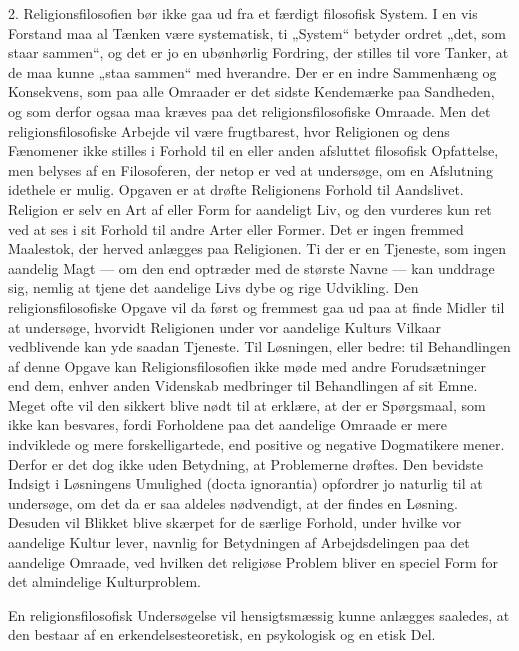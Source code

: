\documentclass[12pt,a4paper,openany]{book}
\newcommand{\opage}[1]{\marginnote{\footnotesize\textit{[#1]}}}
\begin{document}
2. Religionsfilosofien bør ikke gaa ud fra et færdigt filosofisk System.
I en vis Forstand maa al Tænken være systematisk, ti „System“ betyder
ordret „det, som staar sammen“, og det er jo en ubønhørlig Fordring, der
stilles til vore Tanker, at de maa kunne „staa sammen“ med hverandre.
Der er en indre Sammenhæng og Konsekvens, som paa alle Omraader er det
sidste Kendemærke paa Sandheden, og som derfor ogsaa maa kræves paa det
religionsfilosofiske Omraade. Men det religionsfilosofiske Arbejde vil
være frugtbarest, hvor Religionen og dens Fænomener ikke stilles i
Forhold til en eller anden afsluttet filosofisk Opfattelse, men belyses
af en Filosoferen, der netop er ved at undersøge, om en Afslutning
idethele er mulig. Opgaven er at drøfte Religionens Forhold til
Aandslivet. Religion er selv en Art af eller Form for aandeligt Liv, og
den vurderes kun ret ved at ses i sit Forhold til andre Arter eller
Former. Det er ingen fremmed Maalestok, der herved anlægges paa
Religionen. Ti der er en Tjeneste, som ingen aandelig Magt --- om den
end optræder med de største Navne --- kan unddrage sig, nemlig at tjene
det aandelige Livs dybe og rige Udvikling. Den religionsfilosofiske
Opgave vil da først og fremmest gaa ud paa at finde Midler til at
undersøge, hvorvidt Religionen under vor aandelige Kulturs Vilkaar
vedblivende kan yde saadan Tjeneste. Til Løsningen, eller bedre: til
Behandlingen af denne Opgave kan Religionsfilosofien ikke møde med andre
Forudsætninger end dem, enhver anden Videnskab medbringer til
Behandlingen af sit Emne. Meget ofte vil den sikkert blive nødt til at
erklære, at der er Spørgsmaal, som ikke kan besvares, fordi Forholdene
paa det aandelige Omraade er mere indviklede og mere forskelligartede,
end positive og negative Dogmatikere mener. Derfor er det dog ikke uden
Betydning, at Problemerne drøftes. Den bevidste
\opage{6}Indsigt i Løsningens Umulighed (docta ignorantia) opfordrer jo
naturlig til at undersøge, om det da er saa aldeles nødvendigt, at der
findes en Løsning. Desuden vil Blikket blive skærpet for de særlige
Forhold, under hvilke vor aandelige Kultur lever, navnlig for
Betydningen af Arbejdsdelingen paa det aandelige Omraade, ved hvilken
det religiøse Problem bliver en speciel Form for det almindelige
Kulturproblem.

En religionsfilosofisk Undersøgelse vil hensigtsmæssig kunne anlægges
saaledes, at den bestaar af en erkendelsesteoretisk, en psykologisk og
en etisk Del.
\end{document}
